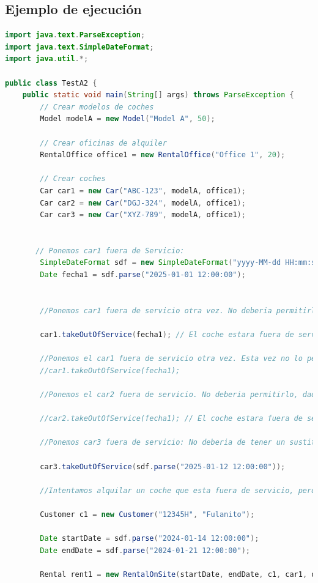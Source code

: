 \subsection{Ejemplo de ejecución}
\begin{lstlisting}[style = javaNormal, language=Java] 
    import java.text.ParseException;
import java.text.SimpleDateFormat;
import java.util.*;

public class TestA2 {
    public static void main(String[] args) throws ParseException {
        // Crear modelos de coches
        Model modelA = new Model("Model A", 50);

        // Crear oficinas de alquiler
        RentalOffice office1 = new RentalOffice("Office 1", 20);

        // Crear coches
        Car car1 = new Car("ABC-123", modelA, office1);
        Car car2 = new Car("DGJ-324", modelA, office1);
        Car car3 = new Car("XYZ-789", modelA, office1);


       // Ponemos car1 fuera de Servicio:
        SimpleDateFormat sdf = new SimpleDateFormat("yyyy-MM-dd HH:mm:ss");
        Date fecha1 = sdf.parse("2025-01-01 12:00:00");


        //Ponemos car1 fuera de servicio otra vez. No deberia permitirlo

        car1.takeOutOfService(fecha1); // El coche estara fuera de servicio hasta 1 de enero del 2025 y se le asocia el car2

        //Ponemos el car1 fuera de servicio otra vez. Esta vez no lo permite
        //car1.takeOutOfService(fecha1);

        //Ponemos el car2 fuera de servicio. No deberia permitirlo, dado que car2 es sustituto de car1

        //car2.takeOutOfService(fecha1); // El coche estara fuera de servicio hasta 1 de enero del 2025

        //Ponemos car3 fuera de servicio: No deberia de tener un sustituto

        car3.takeOutOfService(sdf.parse("2025-01-12 12:00:00"));

        //Intentamos alquilar un coche que esta fuera de servicio, pero que tiene un sustituto

        Customer c1 = new Customer("12345H", "Fulanito");

        Date startDate = sdf.parse("2024-01-14 12:00:00");
        Date endDate = sdf.parse("2024-01-21 12:00:00");

        Rental rent1 = new RentalOnSite(startDate, endDate, c1, car1, office1); // No funciona bien


\end{lstlisting}
